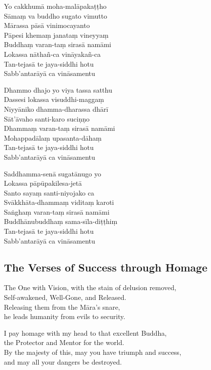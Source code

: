 \begin{paritta}
Yo cakkhumā moha-malāpakaṭṭho\\
Sāmaṃ va buddho sugato vimutto\\
Mārassa pāsā vinimocayanto\\
Pāpesi khemaṃ janataṃ vineyyaṃ\\
Buddhaṃ varan-taṃ sirasā namāmi\\
Lokassa nāthañ-ca vināyakañ-ca\\
Tan-tejasā te jaya-siddhi hotu\\
Sabb'antarāyā ca vināsamentu

Dhammo dhajo yo viya tassa satthu\\
Dassesi lokassa visuddhi-maggaṃ\\
Niyyāniko dhamma-dharassa dhārī\\
Sāt'āvaho santi-karo suciṇṇo\\
Dhammaṃ varan-taṃ sirasā namāmi\\
Mohappadālaṃ upasanta-dāhaṃ\\
Tan-tejasā te jaya-siddhi hotu\\
Sabb'antarāyā ca vināsamentu

Saddhamma-senā sugatānugo yo\\
Lokassa pāpūpakilesa-jetā\\
Santo sayaṃ santi-niyojako ca\\
Svākkhāta-dhammaṃ viditaṃ karoti\\
Saṅghaṃ varan-taṃ sirasā namāmi\\
Buddhānubuddhaṃ sama-sīla-diṭṭhiṃ\\
Tan-tejasā te jaya-siddhi hotu\\
Sabb'antarāyā ca vināsamentu 
\end{paritta}

\subsection{The Verses of Success through Homage}


The One with Vision, with the stain of delusion removed,\\
Self-awakened, Well-Gone, and Released.\\
Releasing them from the Māra's snare,\\
he leads humanity from evils to security.

I pay homage with my head to that excellent Buddha,\\
the Protector and Mentor for the world.\\
By the majesty of this, may you have triumph and success,\\
and may all your dangers be destroyed.

